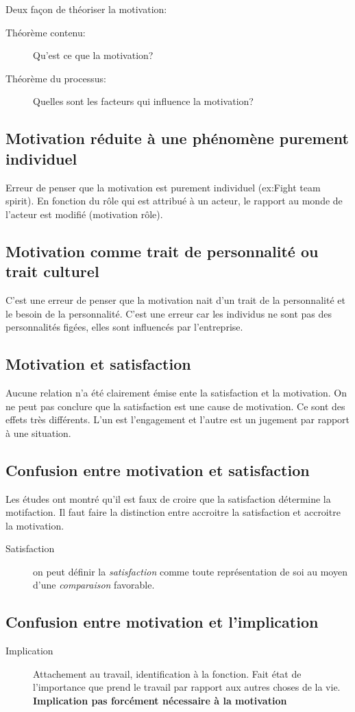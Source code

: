 \documentclass[11pt]{article} %
\begin{document}
		Deux façon de théoriser la motivation:
		\begin{description}
			\item[Théorème contenu: ] Qu'est ce que la motivation?
			\item[Théorème du processus: ] Quelles sont les facteurs qui influence la motivation?
		\end{description}
	\subsection{Motivation réduite à une phénomène purement individuel}
		Erreur de penser que la motivation est purement individuel (ex:Fight team spirit). En fonction du
		rôle qui est attribué à un acteur, le rapport au monde de l'acteur est modifié (motivation rôle).
	\subsection{Motivation comme trait de personnalité ou trait culturel}
		C'est une erreur de penser que la motivation nait d'un trait de la personnalité et le besoin de la 
		personnalité. C'est une erreur car les individus ne sont pas des personnalités figées, elles sont 	
		influencés par l'entreprise.
	\subsection{Motivation et satisfaction}
		Aucune relation n'a été clairement émise ente la satisfaction et la motivation. On ne peut pas conclure 
		que la satisfaction est une cause de motivation. Ce sont des effets très différents. L'un est 
		l'engagement et l'autre est un jugement par rapport à une situation.
	\subsection{Confusion entre motivation et satisfaction}
	Les études ont montré qu'il est faux de croire que la satisfaction détermine la motifaction. Il faut faire la distinction entre accroitre la satisfaction et accroitre la motivation.
	\begin{description}
		\item[Satisfaction] on peut définir la \textit{satisfaction} comme toute représentation de soi au moyen d'une \textit{comparaison} favorable.
	\end{description}

	\subsection{Confusion entre motivation et l'implication}
		\begin{description}
		\item[Implication] Attachement au travail, identification à la fonction. Fait état de l'importance
		que prend le travail par rapport aux autres choses de la vie. \textbf{Implication pas forcément 
		nécessaire à la motivation}
		\end{description}
\end{document}
